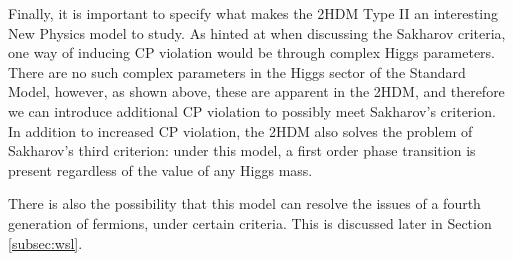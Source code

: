 \documentclass[a4paper,12pt]{article}
\begin{document}
Finally, it is important to specify what makes the 2HDM Type II an interesting New Physics model to study. 
As hinted at when discussing the Sakharov criteria, one way of inducing CP violation would be through complex Higgs parameters. 
There are no such complex parameters in the Higgs sector of the Standard Model, however, as shown above, these are apparent in the 2HDM, and therefore we can introduce additional CP violation to possibly meet Sakharov's criterion. 
In addition to increased CP violation, the 2HDM also solves the problem of Sakharov's third criterion: under this model, a first order phase transition is present regardless of the value of any Higgs mass. 

There is also the possibility that this model can resolve the issues of a fourth generation of fermions, under certain criteria. 
This is discussed later in Section \ref{subsec:wsl}.
\end{document}
